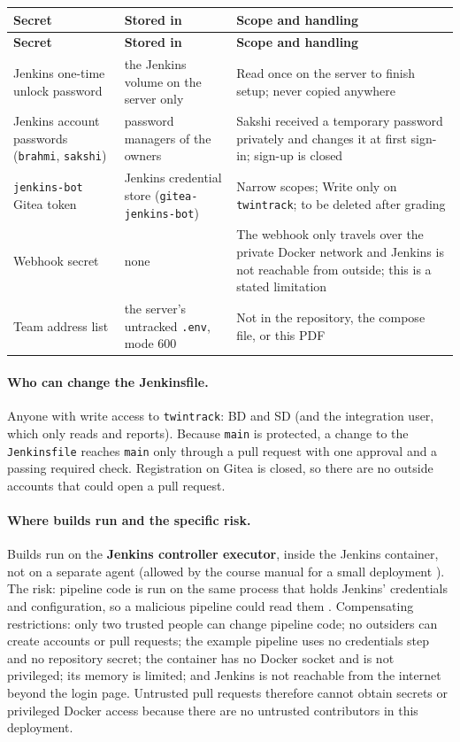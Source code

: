 \begin{tabularx}{\linewidth}{L{3.3cm}L{3.4cm}Y}
\caption{Secrets and where they live (hints only, no values)\label{Table:JenkinsSecrets}}\\
\toprule \textbf{Secret} & \textbf{Stored in} & \textbf{Scope and handling}\\ \midrule
\endfirsthead
\toprule \textbf{Secret} & \textbf{Stored in} & \textbf{Scope and handling}\\ \midrule
\endhead \bottomrule \endlastfoot
Jenkins one-time unlock password & the Jenkins volume on the server only & Read once on the server to finish setup; never copied anywhere\\
Jenkins account passwords (\texttt{brahmi}, \texttt{sakshi}) & password managers of the owners & Sakshi received a temporary password privately and changes it at first sign-in; sign-up is closed\\
\texttt{jenkins-bot} Gitea token & Jenkins credential store (\texttt{gitea-jenkins-bot}) & Narrow scopes; Write only on \texttt{twintrack}; to be deleted after grading\\
Webhook secret & none & The webhook only travels over the private Docker network and Jenkins is not reachable from outside; this is a stated limitation\\
Team address list & the server's untracked \texttt{.env}, mode 600 & Not in the repository, the compose file, or this PDF\\
\end{tabularx}

\paragraph{Who can change the Jenkinsfile.} Anyone with write access to \texttt{twintrack}: BD and SD (and the integration user, which only reads and reports).
Because \texttt{main} is protected, a change to the \texttt{Jenkinsfile} reaches \texttt{main} only through a pull request with one approval and a passing required check.
Registration on Gitea is closed, so there are no outside accounts that could open a pull request.

\paragraph{Where builds run and the specific risk.} Builds run on the \textbf{Jenkins controller executor}, inside the Jenkins container, not on a separate agent
(allowed by the course manual for a small deployment \cite{JenkinsControllerIsolation,DosManual}). The risk: pipeline code is run on the same process that holds
Jenkins' credentials and configuration, so a malicious pipeline could read them \cite{JenkinsCredentials,JenkinsSecurity}. Compensating restrictions: only two trusted
people can change pipeline code; no outsiders can create accounts or pull requests; the example pipeline uses no credentials step and no repository secret; the
container has no Docker socket and is not privileged; its memory is limited; and Jenkins is not reachable from the internet beyond the login page. Untrusted pull
requests therefore cannot obtain secrets or privileged Docker access because there are no untrusted contributors in this deployment.

